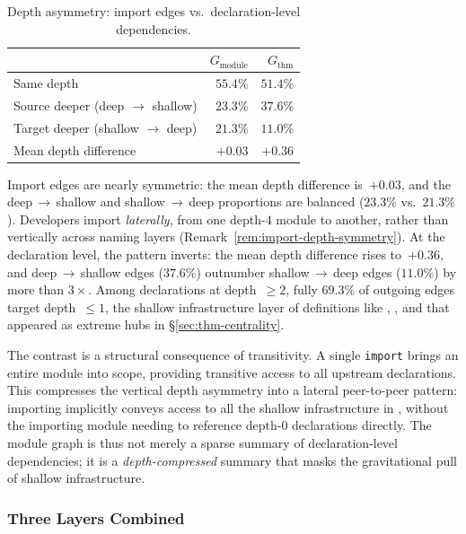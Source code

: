 \begin{table}[ht]
\centering
\caption{Depth asymmetry: import edges vs.\ declaration-level dependencies.}
\label{tab:depth-asymmetry}
\begin{tabular}{lrr}
\toprule
& $G_{\mathrm{module}}$ & $G_{\mathrm{thm}}$ \\
\midrule
Same depth                         & $55.4\%$ & $51.4\%$ \\
Source deeper (deep $\to$ shallow) & $23.3\%$ & $37.6\%$ \\
Target deeper (shallow $\to$ deep) & $21.3\%$ & $11.0\%$ \\
Mean depth difference              & $+0.03$  & $+0.36$  \\
\bottomrule
\end{tabular}
\end{table}

Import edges are nearly symmetric: the mean depth difference is~$+0.03$, and the deep$\,\to\,$shallow and shallow$\,\to\,$deep proportions are balanced ($23.3\%$ vs.\ $21.3\%$). Developers import \emph{laterally}, from one depth-$4$ module to another, rather than vertically across naming layers (Remark~\ref{rem:import-depth-symmetry}). At the declaration level, the pattern inverts: the mean depth difference rises to~$+0.36$, and deep$\,\to\,$shallow edges ($37.6\%$) outnumber shallow$\,\to\,$deep edges ($11.0\%$) by more than $3{\times}$. Among declarations at depth~$\ge 2$, fully $69.3\%$ of outgoing edges target depth~$\le 1$, the shallow infrastructure layer of definitions like , , and  that appeared as extreme hubs in \S\ref{sec:thm-centrality}.

The contrast is a structural consequence of transitivity. A single \texttt{import} brings an entire module into scope, providing transitive access to all upstream declarations. This compresses the vertical depth asymmetry into a lateral peer-to-peer pattern: importing  implicitly conveys access to all the shallow infrastructure in , without the importing module needing to reference depth-$0$ declarations directly. The module graph is thus not merely a sparse summary of declaration-level dependencies; it is a \emph{depth-compressed} summary that masks the gravitational pull of shallow infrastructure.

\subsubsection{Three Layers Combined}
\label{sec:three-layers}

